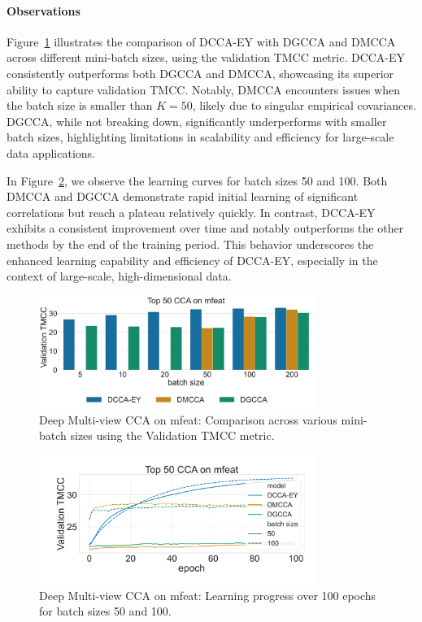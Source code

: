 \paragraph{Observations}
Figure~\ref{fig:dmcca_corr} illustrates the comparison of DCCA-EY with DGCCA and DMCCA across different mini-batch sizes, using the validation TMCC metric.
DCCA-EY consistently outperforms both DGCCA and DMCCA, showcasing its superior ability to capture validation TMCC. Notably, DMCCA encounters issues when the batch size is smaller than $K=50$, likely due to singular empirical covariances.
DGCCA, while not breaking down, significantly underperforms with smaller batch sizes, highlighting limitations in scalability and efficiency for large-scale data applications.

In Figure~\ref{fig:dmcca_lr}, we observe the learning curves for batch sizes 50 and 100. Both DMCCA and DGCCA demonstrate rapid initial learning of significant correlations but reach a plateau relatively quickly. In contrast, DCCA-EY exhibits a consistent improvement over time and notably outperforms the other methods by the end of the training period. This behavior underscores the enhanced learning capability and efficiency of DCCA-EY, especially in the context of large-scale, high-dimensional data.

\begin{figure}
    \centering
    \includegraphics[width=0.8\textwidth]{figures/DMCCA/mfeat_models_different_batch_sizes}
    \caption{Deep Multi-view CCA on mfeat: Comparison across various mini-batch sizes using the Validation TMCC metric.}\label{fig:dmcca_corr}
\end{figure}

\begin{figure}
    \centering
    \includegraphics[width=0.8\textwidth]{figures/DMCCA/mfeat_allbatchsizes_pcc}
    \caption{Deep Multi-view CCA on mfeat: Learning progress over 100 epochs for batch sizes 50 and 100.}\label{fig:dmcca_lr}
\end{figure}

